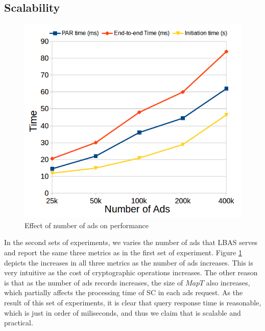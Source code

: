 \subsection{Scalability}
\begin{figure}[h]
\includegraphics[scale=0.5]{figures/scalability.png}
\vspace{-10pt}
\caption{Effect of number of ads on \codename performance}
\label{fig:scalability}
\end{figure}
In the second sets of experiments, we varies the number of ads that LBAS serves and report the same three metrics as in the first set of experiment. Figure \ref{fig:scalability}
depicts the increases in all three metrics as the number of ads increases. This is very intuitive as the cost of cryptographic operations increases. The other reason is that as the number of ads records increases, the size of $MapT$ also increases, which partially affects the processing time of SC in each ads request.
As the result of this set of experiments, it is clear that query response time is reasonable, which is just in order of miliseconds, and thus we claim that \codename is scalable and practical.








